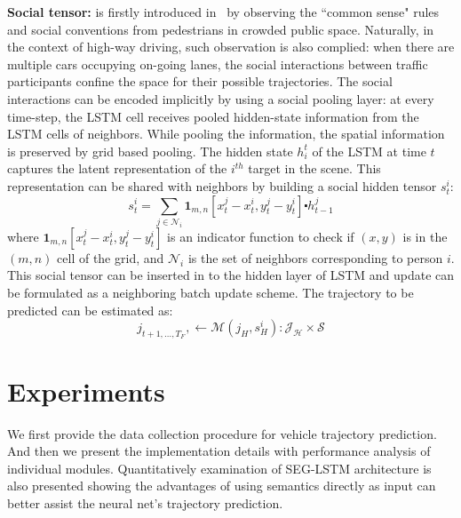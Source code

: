\documentclass[10pt,twocolumn,letterpaper]{article}
\begin{document}
\vspace{\baselineskip}
\noindent \textbf{Social tensor:} is firstly introduced in~\cite{alahi2016social} by observing the ``common sense" rules and social conventions from pedestrians in crowded public space. Naturally, in the context of high-way driving, such observation is also complied: when there are multiple cars occupying on-going lanes, the social interactions between traffic participants confine the space for their possible trajectories. The social interactions can be encoded implicitly by using a social pooling layer: at every time-step, the LSTM cell receives pooled hidden-state information from the LSTM cells of neighbors. While pooling the information, the spatial information is preserved by grid based pooling. The hidden state $h^t_i$ of the LSTM at time $t$ captures the latent representation of the $i^{th}$ target in the scene. This representation can be shared with neighbors by building a social hidden tensor $s^i_t$:
\begin{equation}
s^i_t = \sum_{j \in \mathcal{N}_i} \mathbf{1}_{m,n} [x^j_t - x^i_t, y^j_t - y^i_t] \centerdot  h^j_{t-1}
\label{eq:social_tensor}
\end{equation}
where $\mathbf{1}_{m,n} [x^j_t - x^i_t, y^j_t - y^i_t]$ is an indicator function to check if $(x, y)$ is in the $(m, n)$ cell of the grid, and $\mathcal{N}_i$ is the set of neighbors corresponding to person $i$. This social tensor can be inserted in to the hidden layer of LSTM and update can be formulated as a neighboring batch update scheme. 
The trajectory  to be predicted can be estimated as:
\begin{equation}
j_{t+1, \ldots, T_F}, \leftarrow  \bm{\mathcal{M}}(j_H, s^i_H): \mathcal{J_H}  \times \mathcal{S}
\label{eq:FtS}
\end{equation}


\section{Experiments}

We first provide the data collection procedure for vehicle trajectory prediction. And then we present the implementation details with performance analysis of individual modules. Quantitatively examination of SEG-LSTM architecture is also presented showing the advantages of using semantics directly as input can better assist the neural net's trajectory prediction.
\end{document}
